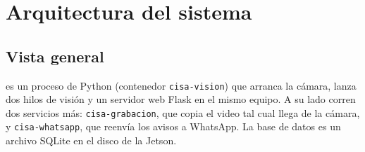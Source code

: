 \chapter{Arquitectura del sistema}
\label{cap:arquitectura}

\section{Vista general}

\cisa{} es un proceso de Python (contenedor \texttt{cisa-vision}) que arranca la
cámara, lanza dos hilos de visión y un servidor web Flask en el mismo equipo. A
su lado corren dos servicios más: \texttt{cisa-grabacion}, que copia el video
tal cual llega de la cámara, y \texttt{cisa-whatsapp}, que reenvía los avisos a
WhatsApp. La base de datos es un archivo SQLite en el disco de la Jetson.

